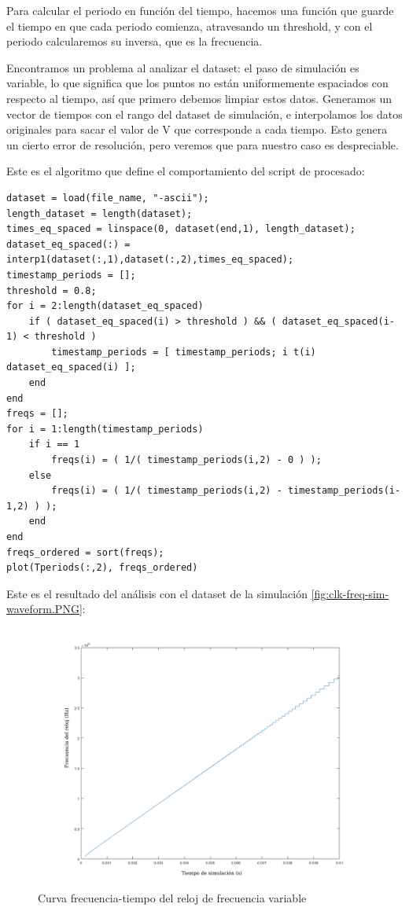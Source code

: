 \documentclass[12pt]{report} %
\begin{document}
	Para calcular el periodo en función del tiempo, hacemos una función que guarde el tiempo en que cada periodo comienza, atravesando un threshold, y con el periodo calcularemos su inversa, que es la frecuencia.
	
	Encontramos un problema al analizar el dataset: el paso de simulación es variable, lo que significa que los puntos no están uniformemente espaciados con respecto al tiempo, así que primero debemos limpiar estos datos. Generamos un vector de tiempos con el rango del dataset de simulación, e interpolamos los datos originales para sacar el valor de V que corresponde a cada tiempo. Esto genera un cierto error de resolución, pero veremos que para nuestro caso es despreciable.
	
	Este es el algoritmo que define el comportamiento del script de procesado:
	
	\begin{lstlisting}[caption={Código en Matlab/Octave para procesar la forma de onda del reloj de frecuencia variable},label={lst:code-clk-var}]
dataset = load(file_name, "-ascii");
length_dataset = length(dataset);
times_eq_spaced = linspace(0, dataset(end,1), length_dataset);
dataset_eq_spaced(:) = interp1(dataset(:,1),dataset(:,2),times_eq_spaced);
timestamp_periods = [];
threshold = 0.8;
for i = 2:length(dataset_eq_spaced)
	if ( dataset_eq_spaced(i) > threshold ) && ( dataset_eq_spaced(i-1) < threshold )
		timestamp_periods = [ timestamp_periods; i t(i) dataset_eq_spaced(i) ];
	end
end
freqs = [];
for i = 1:length(timestamp_periods)
	if i == 1
		freqs(i) = ( 1/( timestamp_periods(i,2) - 0 ) );
	else
		freqs(i) = ( 1/( timestamp_periods(i,2) - timestamp_periods(i-1,2) ) );
	end
end
freqs_ordered = sort(freqs);
plot(Tperiods(:,2), freqs_ordered)
	\end{lstlisting} 

	Este es el resultado del análisis con el dataset de la simulación \ref{fig:clk-freq-sim-waveform.PNG}:
	
	\begin{figure}[H]
		\centerline{\includegraphics[width=1.1\textwidth]{ml-clk-freq-curve.png}}
		\caption[Curva frecuencia-tiempo del reloj de frecuencia variable]{Curva frecuencia-tiempo del reloj de frecuencia variable}
		\label{fig:ml-clk-freq-curve.png}
	\end{figure}
\end{document}
